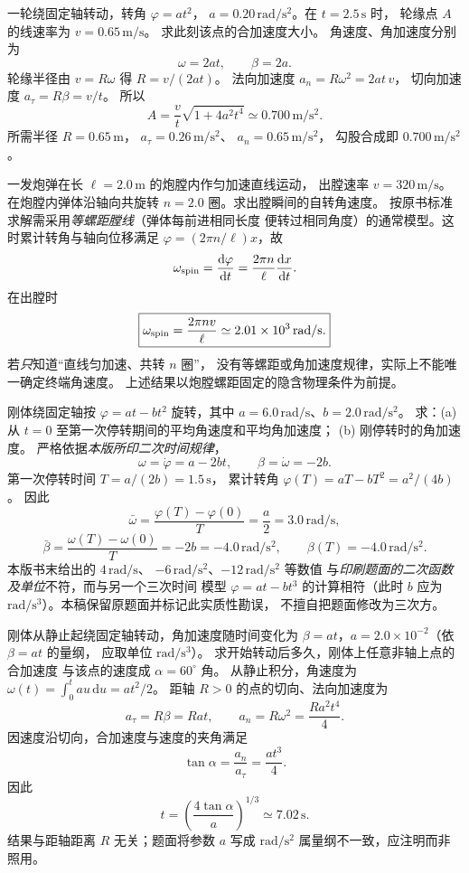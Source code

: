 一轮绕固定轴转动，转角 $\varphi=at^2$，
$a=0.20\,\mathrm{rad/s^2}$。在 $t=2.5\,\mathrm s$ 时，
轮缘点 $A$ 的线速率为 $v=0.65\,\mathrm{m/s}$。
求此刻该点的合加速度大小。
\exsolution
角速度、角加速度分别为
\[
 \omega=2at,\qquad\beta=2a.
\]
轮缘半径由 $v=R\omega$ 得 $R=v/(2at)$。
法向加速度 $a_n=R\omega^2=2at\,v$，
切向加速度 $a_\tau=R\beta=v/t$。
所以
\[
 \boxed{A=\frac vt\sqrt{1+4a^2t^4}
 \simeq0.700\,\mathrm{m/s^2}.}
\]
\excheck 所需半径 $R=0.65\,\mathrm m$，
$a_\tau=0.26\,\mathrm{m/s^2}$、
$a_n=0.65\,\mathrm{m/s^2}$，
勾股合成即 $0.700\,\mathrm{m/s^2}$。

一发炮弹在长 $\ell=2.0\,\mathrm m$ 的炮膛内作匀加速直线运动，
出膛速率 $v=320\,\mathrm{m/s}$。
在炮膛内弹体沿轴向共旋转 $n=2.0$ 圈。求出膛瞬间的自转角速度。
\exsolution
按原书标准求解需采用\emph{等螺距膛线}（弹体每前进相同长度
便转过相同角度）的通常模型。这时累计转角与轴向位移满足
$\varphi=(2\pi n/\ell)x$，故
\[
 \omega_{\rm spin}
 =\frac{\mathrm d\varphi}{\mathrm dt}
 =\frac{2\pi n}{\ell}\frac{\mathrm dx}{\mathrm dt}.
\]
在出膛时
\[
 \boxed{\omega_{\rm spin}=\frac{2\pi n v}{\ell}
 \simeq2.01\times10^3\,\mathrm{rad/s}.}
\]
\excheck 若\emph{只}知道“直线匀加速、共转 $n$ 圈”，
没有等螺距或角加速度规律，实际上不能唯一确定终端角速度。
上述结果以炮膛螺距固定的隐含物理条件为前提。

刚体绕固定轴按 $\varphi=at-bt^2$ 旋转，其中
$a=6.0\,\mathrm{rad/s}$、$b=2.0\,\mathrm{rad/s^2}$。
求：(a) 从 $t=0$ 至第一次停转期间的平均角速度和平均角加速度；
(b) 刚停转时的角加速度。
\exsolution
严格依据\emph{本版所印二次时间规律}，
\[
 \omega=\dot\varphi=a-2bt,\qquad
 \beta=\dot\omega=-2b.
\]
第一次停转时间 $T=a/(2b)=1.5\,\mathrm s$，
累计转角 $\varphi(T)=aT-bT^2=a^2/(4b)$。
因此
\[
 \boxed{\bar\omega=
 \frac{\varphi(T)-\varphi(0)}T=\frac a2
 =3.0\,\mathrm{rad/s},}
\]
\[
 \boxed{\bar\beta=\frac{\omega(T)-\omega(0)}T=-2b
 =-4.0\,\mathrm{rad/s^2},\qquad
 \beta(T)=-4.0\,\mathrm{rad/s^2}.}
\]
\excheck 本版书末给出的 $4\,\mathrm{rad/s}$、
$-6\,\mathrm{rad/s^2}$、$-12\,\mathrm{rad/s^2}$ 等数值
与\emph{印刷题面的二次函数及单位}不符，而与另一个三次时间
模型 $\varphi=at-bt^3$ 的计算相符（此时 $b$ 应为
$\mathrm{rad/s^3}$）。本稿保留原题面并标记此实质性勘误，
不擅自把题面修改为三次方。

刚体从静止起绕固定轴转动，角加速度随时间变化为
$\beta=at$，$a=2.0\times10^{-2}$（依 $\beta=at$ 的量纲，
应取单位 $\mathrm{rad/s^3}$）。
求开始转动后多久，刚体上任意非轴上点的合加速度
与该点的速度成 $\alpha=60^\circ$ 角。
\exsolution
从静止积分，角速度为
$\omega(t)=\int_0^t au\,\mathrm du=at^2/2$。
距轴 $R>0$ 的点的切向、法向加速度为
\[
 a_\tau=R\beta=Rat,\qquad
 a_n=R\omega^2=\frac{Ra^2t^4}{4}.
\]
因速度沿切向，合加速度与速度的夹角满足
\[
 \tan\alpha=\frac{a_n}{a_\tau}=\frac{at^3}{4}.
\]
因此
\[
 \boxed{t=\left(\frac{4\tan\alpha}{a}\right)^{1/3}
 \simeq7.02\,\mathrm s.}
\]
\excheck 结果与距轴距离 $R$ 无关；题面将参数 $a$ 写成
$\mathrm{rad/s^2}$ 属量纲不一致，应注明而非照用。


